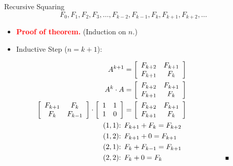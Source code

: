\documentclass{beamer}
\begin{document}
\begin{frame}{Recursive Squaring}
    $$
        F_0, F_1, F_2, F_3, \ldots, F_{k-2},  F_{k-1}, F_{k}, F_{k+1}, F_{k+2}, \ldots
    $$
    \begin{itemize}
        \item[] \textbf{\textcolor{red}{Proof of theorem.}} (Induction on $n$.)
        \item[] Inductive Step ($n = k + 1$):
    \end{itemize}
    \begin{equation*}
        \begin{split}
        A^{k+1}
        &=
        \left[
            \begin{array}{c c}
                F_{k + 2} & F_{k + 1} \\
                F_{k + 1} & F_{k}
            \end{array}
        \right] \\
        A^{k} \cdot A
        &=
        \left[
            \begin{array}{c c}
                F_{k + 2} & F_{k + 1} \\
                F_{k + 1} & F_{k}
            \end{array}
        \right] \\
        \left[
            \begin{array}{c c}
                F_{k + 1} & F_k \\
                F_k       & F_{k - 1}
            \end{array}
        \right]
        \cdot
        \left[
            \begin{array}{c c}
                1 & 1 \\
                1 & 0
            \end{array}
        \right]
        &=
        \left[
            \begin{array}{c c}
                F_{k + 2} & F_{k + 1} \\
                F_{k + 1} & F_{k}
            \end{array}
        \right] \\
        (1,1)\text{: } & F_{k+1} + F_{k} = F_{k+2} \\
        (1,2)\text{: } & F_{k+1} + 0 = F_{k+1} \\
        (2,1)\text{: } & F_{k} + F_{k-1} = F_{k+1} \\
        (2,2)\text{: } & F_{k} + 0 = F_{k} \text{\tiny \hspace{30mm} $\blacksquare$}\\
        \end{split}
    \end{equation*}
\end{frame}
\end{document}
